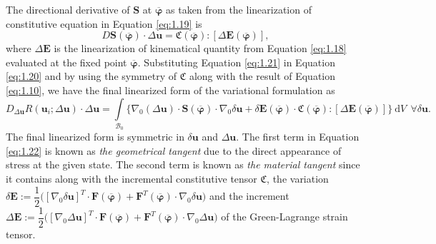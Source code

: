 \documentclass[11pt,a4paper,final]{article}
\begin{document}
The directional derivative of $\mathbf{S}$ at $\overline{\bm{\varphi}}$ as taken from the linearization of constitutive equation in Equation \eqref{eq:1.19} is 
\begin{equation}
D \mathbf{S}(\overline{\bm{\varphi}}) \cdot \Delta\mathbf{u} = \mathfrak{C}(\overline{\bm{\varphi}}) : \left[ \Delta \mathbf{E}(\overline{\bm{\varphi}}) \right],
\label{eq:1.21}
\end{equation}
where $\Delta \mathbf{E}$ is the linearization of kinematical quantity from Equation \eqref{eq:1.18} evaluated at the fixed point $\overline{\bm{\varphi}}$.  Substituting Equation \eqref{eq:1.21} in Equation \eqref{eq:1.20} and by using the symmetry of $\mathfrak{C}$ along with the result of Equation \eqref{eq:1.10}, we have the final linearized form of the variational formulation as
\begin{equation}
D_{\Delta\mathbf{u}} R(\mathbf{u}_i; \Delta \mathbf{u}) \cdot \Delta\mathbf{u} = \int\limits_{\mathcal{B}_0} \Big\lbrace \nabla_0 (\Delta\mathbf{u}) \cdot \mathbf{S}(\overline{\bm{\varphi}}) \cdot \nabla_0 \delta \mathbf{u} + \delta \mathbf{E}(\overline{\bm{\varphi}}) \cdot \mathfrak{C}(\overline{\bm{\varphi}}) : \left[ \Delta\mathbf{E}(\overline{\bm{\varphi}}) \right] \Big\rbrace \ \mathrm{d}V \ \ \forall \delta\mathbf{u}.
\label{eq:1.22}
\end{equation}
The final linearized form is symmetric in $\delta\mathbf{u}$ and $\Delta\mathbf{u}$. The first term in Equation \eqref{eq:1.22} is known as \textit{the geometrical tangent} due to the direct appearance of stress at the given state. The second term is known as \textit{the material tangent} since it contains along with the incremental constitutive tensor $\mathfrak{C}$, the variation $\delta \mathbf{E} := \dfrac{1}{2} \Big(\left[\nabla_0 \delta\mathbf{u} \right]^T \cdot \mathbf{F}(\overline{\bm{\varphi}}) + \mathbf{F}^T (\overline{\bm{\varphi}}) \cdot \nabla_0 \delta\mathbf{u} \Big)$ and the increment $\Delta \mathbf{E} := \dfrac{1}{2} \Big(\left[\nabla_0 \Delta\mathbf{u}\right]^T \cdot \mathbf{F}(\overline{\bm{\varphi}}) + \mathbf{F}^T (\overline{\bm{\varphi}}) \cdot \nabla_0 \Delta\mathbf{u} \Big)$ of the Green-Lagrange strain tensor.  
 
\end{document}
